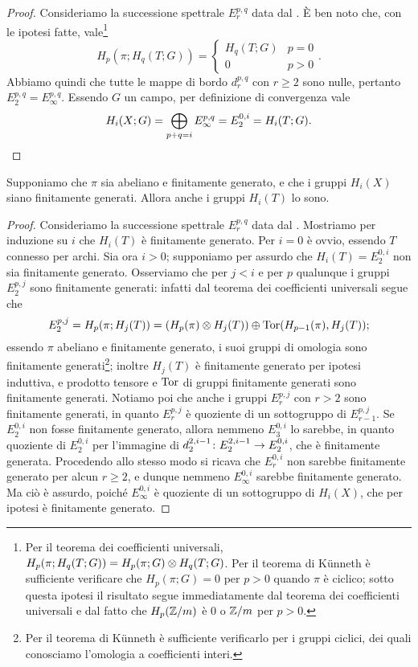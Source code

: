 \begin{proof}
Consideriamo la successione spettrale \(E^{p,q}_r\) data dal . È ben noto che, con le ipotesi fatte, vale\footnote{Per il teorema dei coefficienti universali, \(H_p(\pi;H_q(T;G))=H_p(\pi;G)\mathbin{\otimes} H_q(T;G)\). Per il teorema di Künneth è sufficiente verificare che \(H_p(\pi;G)=0\) per \(p>0\) quando \(\pi\) è ciclico; sotto questa ipotesi il risultato segue immediatamente dal teorema dei coefficienti universali e dal fatto che \(H_p(\mathbb{Z}/m)\) è \(0\) o \(\mathbb{Z}/m\) per \(p>0\).}
\[
H_p(\pi;H_q(T;G))=
\begin{cases}
H_q(T;G)&p=0\\
0&p>0
\end{cases}.
\]
Abbiamo quindi che tutte le mappe di bordo \(d^{p,q}_r\) con \(r\ge 2\) sono nulle, pertanto \(E^{p,q}_2=E^{p,q}_\infty\). Essendo \(G\) un campo, per definizione di convergenza vale
\[
H_i(X;G)=\bigoplus_{p+q=i}E^{p,q}_\infty=E^{0,i}_2=H_i(T;G).\qedhere
\]
\end{proof}

\begin{proposition}
Supponiamo che \(\pi\) sia abeliano e finitamente generato, e che i gruppi \(H_i(X)\) siano finitamente generati. Allora anche i gruppi \(H_i(T)\) lo sono.
\end{proposition}
\begin{proof}
Consideriamo la successione spettrale \(E^{p,q}_r\) data dal . Mostriamo per induzione su \(i\) che \(H_i(T)\) è finitamente generato. Per \(i=0\) è ovvio, essendo \(T\) connesso per archi. Sia ora \(i>0\); supponiamo per assurdo che \(H_i(T)=E^{0,i}_2\) non sia finitamente generato. Osserviamo che per \(j<i\) e per \(p\) qualunque i gruppi \(E^{p,j}_2\) sono finitamente generati: infatti dal teorema dei coefficienti universali segue che
\[
E^{p,j}_2=H_p(\pi;H_j(T))=(H_p(\pi)\mathbin{\otimes} H_j(T))\mathbin{\oplus}\operatorname{Tor}(H_{p-1}(\pi),H_j(T));
\]
essendo \(\pi\) abeliano e finitamente generato, i suoi gruppi di omologia sono finitamente generati\footnote{Per il teorema di Künneth è sufficiente verificarlo per i gruppi ciclici, dei quali conosciamo l'omologia a coefficienti interi.}; inoltre \(H_j(T)\) è finitamente generato per ipotesi induttiva, e prodotto tensore e \(\operatorname{Tor}\) di gruppi finitamente generati sono finitamente generati. Notiamo poi che anche i gruppi \(E^{p,j}_r\) con \(r>2\) sono finitamente generati, in quanto \(E^{p,j}_r\) è quoziente di un sottogruppo di \(E^{p,j}_{r-1}\). Se \(E^{0,i}_2\) non fosse finitamente generato, allora nemmeno \(E^{0,i}_3\) lo sarebbe, in quanto quoziente di \(E^{0,i}_2\) per l'immagine di \(\map{d^{2,i-1}_2}{E^{2,i-1}_2}{E^{0,i}_2}\), che è finitamente generata. Procedendo allo stesso modo si ricava che \(E^{0,i}_r\) non sarebbe finitamente generato per alcun \(r\ge 2\), e dunque nemmeno \(E^{0,i}_\infty\) sarebbe finitamente generato. Ma ciò è assurdo, poiché \(E^{0,i}_\infty\) è quoziente di un sottogruppo di \(H_i(X)\), che per ipotesi è finitamente generato.
\end{proof}